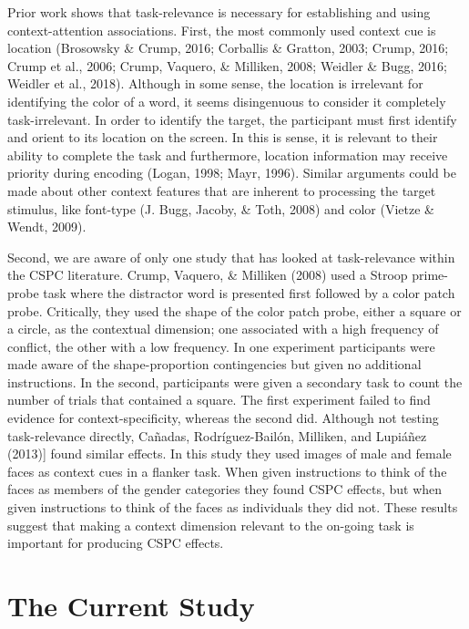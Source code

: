 \documentclass[english,,man,floatsintext]{apa6}
\begin{document}
Prior work shows that task-relevance is necessary for establishing and
using context-attention associations. First, the most commonly used
context cue is location (Brosowsky \& Crump, 2016; Corballis \& Gratton,
2003; Crump, 2016; Crump et al., 2006; Crump, Vaquero, \& Milliken,
2008; Weidler \& Bugg, 2016; Weidler et al., 2018). Although in some
sense, the location is irrelevant for identifying the color of a word,
it seems disingenuous to consider it completely task-irrelevant. In
order to identify the target, the participant must first identify and
orient to its location on the screen. In this is sense, it is relevant
to their ability to complete the task and furthermore, location
information may receive priority during encoding (Logan, 1998; Mayr,
1996). Similar arguments could be made about other context features that
are inherent to processing the target stimulus, like font-type (J. Bugg,
Jacoby, \& Toth, 2008) and color (Vietze \& Wendt, 2009).

Second, we are aware of only one study that has looked at task-relevance
within the CSPC literature. Crump, Vaquero, \& Milliken (2008) used a
Stroop prime-probe task where the distractor word is presented first
followed by a color patch probe. Critically, they used the shape of the
color patch probe, either a square or a circle, as the contextual
dimension; one associated with a high frequency of conflict, the other
with a low frequency. In one experiment participants were made aware of
the shape-proportion contingencies but given no additional instructions.
In the second, participants were given a secondary task to count the
number of trials that contained a square. The first experiment failed to
find evidence for context-specificity, whereas the second did. Although
not testing task-relevance directly, Cañadas, Rodríguez-Bailón,
Milliken, and Lupiáñez (2013){]} found similar effects. In this study
they used images of male and female faces as context cues in a flanker
task. When given instructions to think of the faces as members of the
gender categories they found CSPC effects, but when given instructions
to think of the faces as individuals they did not. These results suggest
that making a context dimension relevant to the on-going task is
important for producing CSPC effects.

\section{The Current Study}\label{the-current-study}
\end{document}
